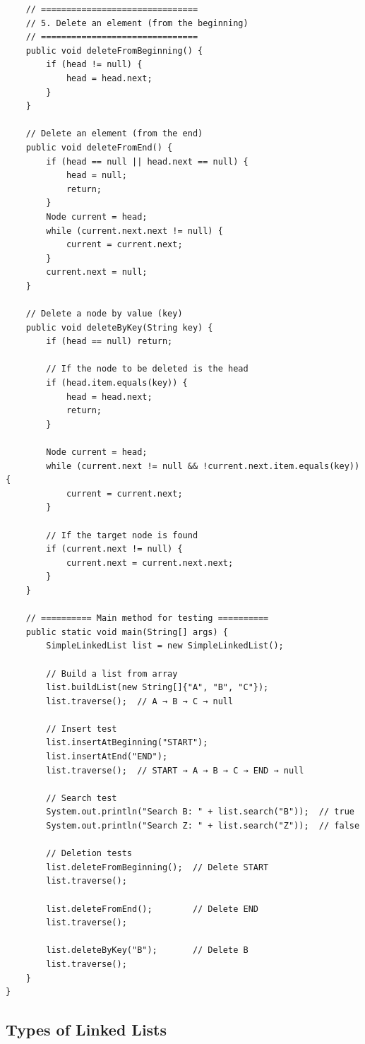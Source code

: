 \documentclass[letterpaper,12pt]{article}
\begin{document}
\begin{verbatim}
    // ===============================
    // 5. Delete an element (from the beginning)
    // ===============================
    public void deleteFromBeginning() {
        if (head != null) {
            head = head.next;
        }
    }

    // Delete an element (from the end)
    public void deleteFromEnd() {
        if (head == null || head.next == null) {
            head = null;
            return;
        }
        Node current = head;
        while (current.next.next != null) {
            current = current.next;
        }
        current.next = null;
    }

    // Delete a node by value (key)
    public void deleteByKey(String key) {
        if (head == null) return;

        // If the node to be deleted is the head
        if (head.item.equals(key)) {
            head = head.next;
            return;
        }

        Node current = head;
        while (current.next != null && !current.next.item.equals(key)) {
            current = current.next;
        }

        // If the target node is found
        if (current.next != null) {
            current.next = current.next.next;
        }
    }

    // ========== Main method for testing ==========
    public static void main(String[] args) {
        SimpleLinkedList list = new SimpleLinkedList();

        // Build a list from array
        list.buildList(new String[]{"A", "B", "C"});
        list.traverse();  // A → B → C → null

        // Insert test
        list.insertAtBeginning("START");
        list.insertAtEnd("END");
        list.traverse();  // START → A → B → C → END → null

        // Search test
        System.out.println("Search B: " + list.search("B"));  // true
        System.out.println("Search Z: " + list.search("Z"));  // false

        // Deletion tests
        list.deleteFromBeginning();  // Delete START
        list.traverse();

        list.deleteFromEnd();        // Delete END
        list.traverse();

        list.deleteByKey("B");       // Delete B
        list.traverse();
    }
}
\end{verbatim}

\subsection{Types of Linked Lists}
\end{document}
